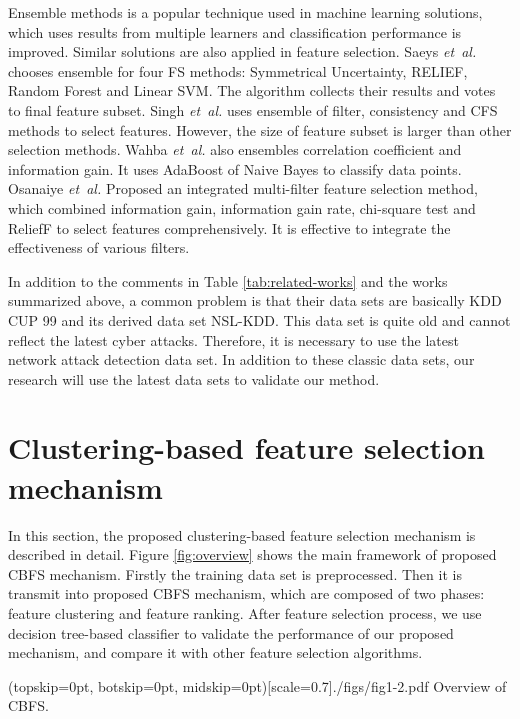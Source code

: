 \documentclass{ieeeaccess}
\theoremstyle{definition}
\begin{document}
Ensemble methods is a popular technique used in machine learning solutions, which uses results from multiple learners and classification performance is improved. Similar solutions are also applied in feature selection. 
Saeys \emph{et~al.} \cite{Saeys2008} chooses ensemble for four FS methods: Symmetrical Uncertainty, RELIEF, Random Forest and Linear SVM. The algorithm collects their results and votes to final feature subset.
Singh \emph{et~al.} \cite{Singh2015} uses ensemble of filter, consistency and CFS methods to select features. However, the size of feature subset is larger than other selection methods.
Wahba \emph{et~al.} \cite{Wahba2015} also ensembles correlation coefficient and information gain. It uses AdaBoost of Naive Bayes to classify data points. 
Osanaiye \emph{et~al.} \cite{Osanaiye2016} Proposed an integrated multi-filter feature selection method, which combined information gain, information gain rate, chi-square test and ReliefF to select features comprehensively. It is effective to integrate the effectiveness of various filters.

In addition to the comments in Table \ref{tab:related-works} and the works summarized above, a common problem is that their data sets are basically KDD CUP 99 and its derived data set NSL-KDD. This data set is quite old and cannot reflect the latest cyber attacks. Therefore, it is necessary to use the latest network attack detection data set. In addition to these classic data sets, our research will use the latest data sets to validate our method.

\section{Clustering-based feature selection mechanism}
\label{sec:method}

In this section, the proposed clustering-based feature selection mechanism is described in detail. Figure \ref{fig:overview} shows the main framework of proposed CBFS mechanism. Firstly the training data set is preprocessed. Then it is transmit into proposed CBFS mechanism, which are composed of two phases: feature clustering and feature ranking. After feature selection process, we use decision tree-based classifier to validate the performance of our proposed mechanism, and compare it with other feature selection algorithms.

\Figure[!htpb](topskip=0pt, botskip=0pt, midskip=0pt)[scale=0.7]{./figs/fig1-2.pdf}
{Overview of CBFS. \label{fig:overview}}
\end{document}
